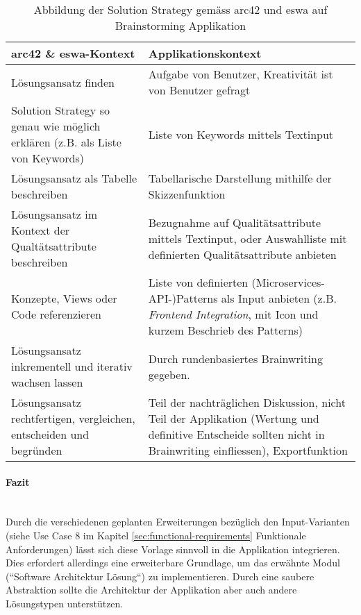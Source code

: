 \renewcommand{\arraystretch}{1.7}
\begin{table}
	\centering
	\begin{tabular}{|p{6cm}|p{6cm}|}
		\hline
		\textbf{arc42 \& eswa\tablefootnote{Buch Effektive Softwarearchitekturen}-Kontext} & \textbf{Applikationskontext}\\
		\hline
		Lösungsansatz finden & Aufgabe von Benutzer, Kreativität ist von Benutzer gefragt\\
		\hline
		Solution Strategy so genau wie möglich erklären (z.B. als Liste von Keywords) & Liste von Keywords mittels Textinput \\
		\hline
		Lösungsansatz als Tabelle beschreiben & Tabellarische Darstellung mithilfe der Skizzenfunktion\\
		\hline
		Lösungsansatz im Kontext der Qualtätsattribute beschreiben & Bezugnahme auf Qualitätsattribute mittels Textinput, oder Auswahlliste mit definierten Qualitätsattribute anbieten\\
		\hline
		Konzepte, Views oder Code referenzieren & Liste von definierten (Microservices-API-)Patterns\cite{microservices-api} als Input anbieten (z.B. \textit{Frontend Integration}, mit Icon und kurzem Beschrieb des Patterns)\\
		\hline
		Lösungsansatz inkrementell und iterativ wachsen lassen & Durch rundenbasiertes Brainwriting gegeben. \\
		\hline
		Lösungsansatz rechtfertigen, vergleichen, entscheiden und begründen & Teil der nachträglichen Diskussion, nicht Teil der Applikation (Wertung und definitive Entscheide sollten nicht in Brainwriting einfliessen), Exportfunktion \\
		\hline
	\end{tabular}
	\caption{Abbildung der Solution Strategy gemäss arc42 und eswa auf Brainstorming Applikation}
	\label{tab:arc42-mapping}
\end{table}
\paragraph{Fazit}~\\
Durch die verschiedenen geplanten Erweiterungen bezüglich den Input-Varianten (siehe Use Case 8 im Kapitel \ref{sec:functional-requirements} Funktionale Anforderungen) lässt sich diese Vorlage sinnvoll in die Applikation integrieren. Dies erfordert allerdings eine erweiterbare Grundlage, um das erwähnte Modul (``Software Architektur Lösung``) zu implementieren. Durch eine saubere Abstraktion sollte die Architektur der Applikation aber auch andere Lösungstypen unterstützen.
\newpage

